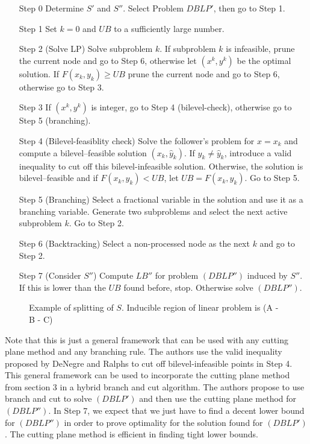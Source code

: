 \documentclass{article}
\begin{document}
	\begin{itemize}
		\item[Step 0]Determine $S'$ and $S''$. Select Problem $DBLP'$, then go to Step 1.
		\item[Step 1]Set $k = 0$ and $UB$ to a sufficiently large number.
		\item[Step 2](Solve LP) Solve subproblem $k$. If subproblem $k$ is infeasible, prune the current node and
		go to Step 6, otherwise let $(x^k,y^k)$ be the optimal solution. If $F(x_k,y_k) \ge UB$ prune the current node and go to Step 6, otherwise go to Step 3.
		\item [Step 3] If $(x^k, y^k)$ is integer, go to Step 4 (bilevel-check), otherwise go to Step 5 (branching).
		\item [Step 4](Bilevel-feasiblity check) Solve the follower’s problem for $x = x_k$ and compute a bilevel–feasible solution $(x_k , \hat y_k )$. If $y_k \neq \hat y_k$, introduce a valid inequality to cut off this bilevel-infeasible solution. Otherwise,
		the solution is bilevel–feasible and if $F(x_k , y_k ) < U B$, let $U B = F(x_k , y_k )$.
		Go to Step 5.
		\item [Step 5](Branching) Select a fractional variable in the solution and use it as a branching variable. Generate two subproblems and select the next active subproblem $k$. Go to Step 2.
		\item [Step 6](Backtracking) Select a non-processed node as the next $k$ and go to Step 2.
		\item [Step 7](Consider $S''$) Compute $LB''$ for problem $(DBLP'')$ induced by $S''$. If this is lower than the $UB$ found before, stop.
		Otherwise solve $(DBLP'')$.
	\end{itemize}
	
		\begin{figure}
						\centering
			
			\caption{Example of splitting of $S$. Inducible region of linear problem is (A - B - C)}
		\end{figure}
Note that this is just a general framework that can be used with any cutting plane method and any branching rule. The authors use the valid inequality proposed by DeNegre and Ralphs \cite{DeNegre2009} to cut off bilevel-infeasible points in Step 4.
This general framework can be used to incorporate the cutting plane method from section 3 in a hybrid branch and cut algorithm. The authors propose to use branch and cut to solve $(DBLP')$ and then use the cutting plane method for $(DBLP'')$. In Step 7, we expect that we just have to find a decent lower bound for $(DBLP'')$ in order to prove optimality for the solution found for $(DBLP')$. The cutting plane method is efficient in finding tight lower bounds. 
\end{document}

